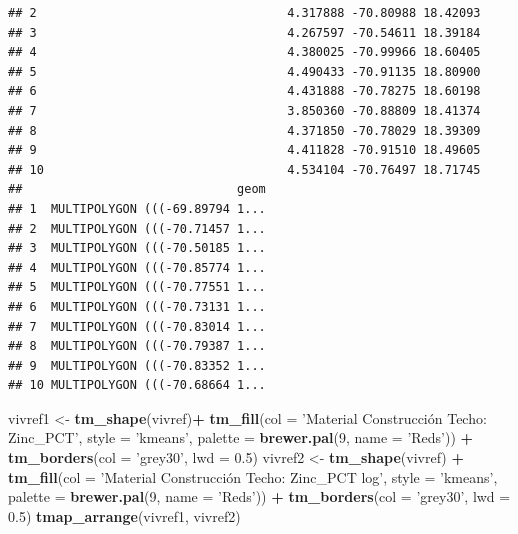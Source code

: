 \documentclass[11pt,]{article}
\newenvironment{Shaded}{\begin{snugshade}}{\end{snugshade}}
\newcommand{\KeywordTok}[1]{\textcolor[rgb]{0.13,0.29,0.53}{\textbf{#1}}}
\newcommand{\DataTypeTok}[1]{\textcolor[rgb]{0.13,0.29,0.53}{#1}}
\newcommand{\DecValTok}[1]{\textcolor[rgb]{0.00,0.00,0.81}{#1}}
\newcommand{\FloatTok}[1]{\textcolor[rgb]{0.00,0.00,0.81}{#1}}
\newcommand{\StringTok}[1]{\textcolor[rgb]{0.31,0.60,0.02}{#1}}
\newcommand{\OperatorTok}[1]{\textcolor[rgb]{0.81,0.36,0.00}{\textbf{#1}}}
\newcommand{\NormalTok}[1]{#1}
\begin{document}
\begin{verbatim}
## 2                                   4.317888 -70.80988 18.42093
## 3                                   4.267597 -70.54611 18.39184
## 4                                   4.380025 -70.99966 18.60405
## 5                                   4.490433 -70.91135 18.80900
## 6                                   4.431888 -70.78275 18.60198
## 7                                   3.850360 -70.88809 18.41374
## 8                                   4.371850 -70.78029 18.39309
## 9                                   4.411828 -70.91510 18.49605
## 10                                  4.534104 -70.76497 18.71745
##                              geom
## 1  MULTIPOLYGON (((-69.89794 1...
## 2  MULTIPOLYGON (((-70.71457 1...
## 3  MULTIPOLYGON (((-70.50185 1...
## 4  MULTIPOLYGON (((-70.85774 1...
## 5  MULTIPOLYGON (((-70.77551 1...
## 6  MULTIPOLYGON (((-70.73131 1...
## 7  MULTIPOLYGON (((-70.83014 1...
## 8  MULTIPOLYGON (((-70.79387 1...
## 9  MULTIPOLYGON (((-70.83352 1...
## 10 MULTIPOLYGON (((-70.68664 1...
\end{verbatim}

\begin{Shaded}
\begin{Highlighting}[]
\NormalTok{vivref1 <-}\StringTok{ }\KeywordTok{tm_shape}\NormalTok{(vivref)}\OperatorTok{+}\StringTok{ }
\StringTok{  }\KeywordTok{tm_fill}\NormalTok{(}\DataTypeTok{col =} \StringTok{'Material Construcción Techo: Zinc_PCT'}\NormalTok{, }\DataTypeTok{style =} \StringTok{'kmeans'}\NormalTok{, }\DataTypeTok{palette =} \KeywordTok{brewer.pal}\NormalTok{(}\DecValTok{9}\NormalTok{, }\DataTypeTok{name =} \StringTok{'Reds'}\NormalTok{)) }\OperatorTok{+}
\StringTok{  }\KeywordTok{tm_borders}\NormalTok{(}\DataTypeTok{col =} \StringTok{'grey30'}\NormalTok{, }\DataTypeTok{lwd =} \FloatTok{0.5}\NormalTok{)}
\NormalTok{vivref2 <-}\StringTok{ }\KeywordTok{tm_shape}\NormalTok{(vivref) }\OperatorTok{+}
\StringTok{  }\KeywordTok{tm_fill}\NormalTok{(}\DataTypeTok{col =} \StringTok{'Material Construcción Techo: Zinc_PCT log'}\NormalTok{, }\DataTypeTok{style =} \StringTok{'kmeans'}\NormalTok{, }\DataTypeTok{palette =} \KeywordTok{brewer.pal}\NormalTok{(}\DecValTok{9}\NormalTok{, }\DataTypeTok{name =} \StringTok{'Reds'}\NormalTok{)) }\OperatorTok{+}
\StringTok{  }\KeywordTok{tm_borders}\NormalTok{(}\DataTypeTok{col =} \StringTok{'grey30'}\NormalTok{, }\DataTypeTok{lwd =} \FloatTok{0.5}\NormalTok{)}
\KeywordTok{tmap_arrange}\NormalTok{(vivref1, vivref2)}
\end{Highlighting}
\end{Shaded}
\end{document}
